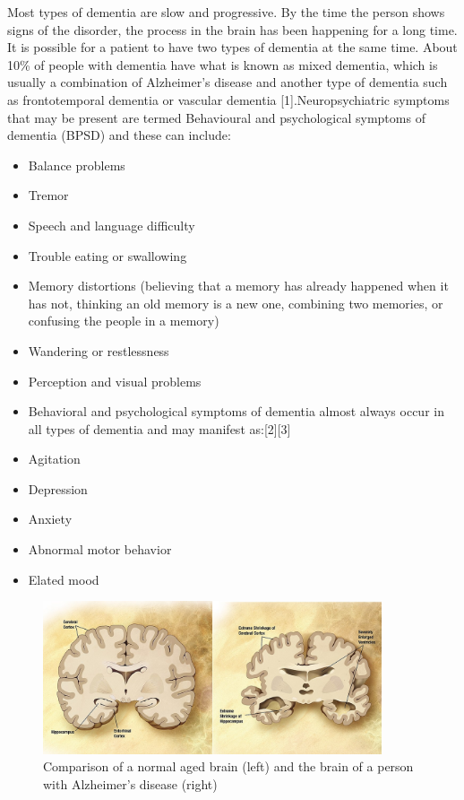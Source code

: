  Most types of dementia are slow and progressive. By the time the person shows signs of the disorder, the process in the brain has been happening for a long time. It is possible for a patient to have two types of dementia at the same time. About 10\% of people with dementia have what is known as mixed dementia, which is usually a combination of Alzheimer's disease and another type of dementia such as frontotemporal dementia or vascular dementia [1].Neuropsychiatric symptoms that may be present are termed Behavioural and psychological symptoms of dementia (BPSD) and these can include:
\begin{itemize}
  \item Balance problems
  \item Tremor
\item Speech and language difficulty
\item Trouble eating or swallowing
\item  Memory distortions (believing that a memory has already happened when it has not, thinking an old memory is a new one, combining two memories, or confusing the people in a memory)
\item Wandering or restlessness
\item Perception and visual problems
\item Behavioral and psychological symptoms of dementia almost always occur in all types of dementia and may manifest as:[2][3]
\item Agitation
\item Depression
\item Anxiety
\item Abnormal motor behavior
\item Elated mood


\end{itemize}
\begin{figure}[h]
	\begin{center}
		\includegraphics[width =10cm]{1.jpg}
		\caption{Comparison of a normal aged brain (left) and the brain of a person with Alzheimer's disease (right)}
		\label{ab}
	\end{center}
\end{figure}


